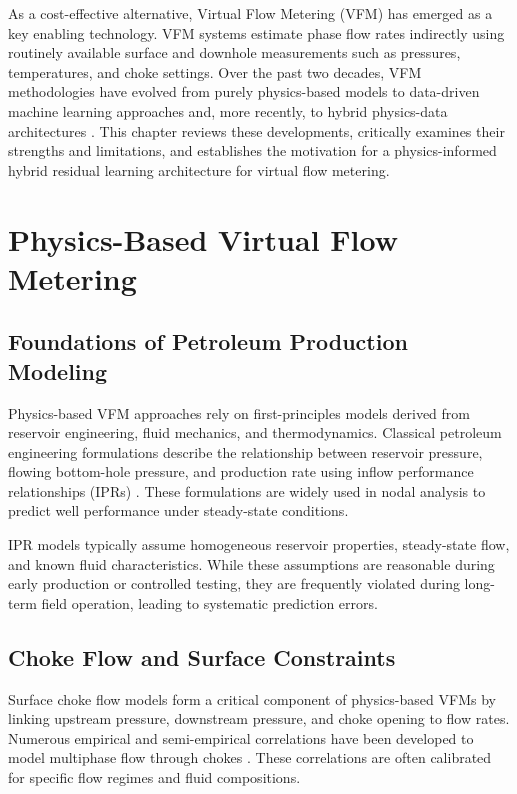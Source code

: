 \documentclass[12pt,APA]{uomthesis}
\begin{document}
As a cost-effective alternative, Virtual Flow Metering (VFM) has emerged as a key enabling technology. VFM systems estimate phase flow rates indirectly using routinely available surface and downhole measurements such as pressures, temperatures, and choke settings. Over the past two decades, VFM methodologies have evolved from purely physics-based models to data-driven machine learning approaches and, more recently, to hybrid physics-data architectures \citep{bikmukhametov2020first}. This chapter reviews these developments, critically examines their strengths and limitations, and establishes the motivation for a physics-informed hybrid residual learning architecture for virtual flow metering.

\section{Physics-Based Virtual Flow Metering}
\subsection{Foundations of Petroleum Production Modeling}
Physics-based VFM approaches rely on first-principles models derived from reservoir engineering, fluid mechanics, and thermodynamics. Classical petroleum engineering formulations describe the relationship between reservoir pressure, flowing bottom-hole pressure, and production rate using inflow performance relationships (IPRs) \citep{dake1978fundamentals}. These formulations are widely used in nodal analysis to predict well performance under steady-state conditions.

IPR models typically assume homogeneous reservoir properties, steady-state flow, and known fluid characteristics. While these assumptions are reasonable during early production or controlled testing, they are frequently violated during long-term field operation, leading to systematic prediction errors.

\subsection{Choke Flow and Surface Constraints}
Surface choke flow models form a critical component of physics-based VFMs by linking upstream pressure, downstream pressure, and choke opening to flow rates. Numerous empirical and semi-empirical correlations have been developed to model multiphase flow through chokes \citep{agwu2022modelling,alrumah2019new}. These correlations are often calibrated for specific flow regimes and fluid compositions.
\end{document}
